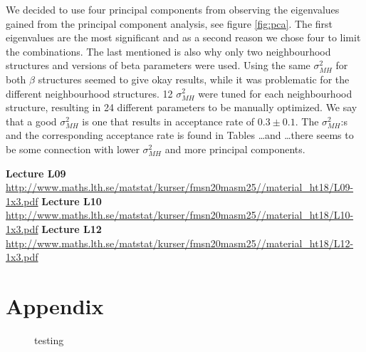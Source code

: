 \documentclass[a4paper,english]{article}
\newcommand{\sexion}[1]{\section{#1}}
\begin{document}
We decided to use four principal components from observing the eigenvalues gained from the principal component analysis, see figure \ref{fig:pca}. The first eigenvalues are the most significant and as a second reason we chose four to limit the combinations. The last mentioned is also why only two neighbourhood structures and versions of beta parameters were used.
Using the same $\sigma_{MH}^2$ for both $\beta$ structures seemed to give okay results, while it was problematic for the different neighbourhood structures. 12 $\sigma_{MH}^2$ were tuned for each neighbourhood structure, resulting in 24 different parameters to be manually optimized.
We say that a good $\sigma_{MH}^2$ is one that results in acceptance rate of $0.3 \pm 0.1$.
The $\sigma_{MH}^2$:s and the corresponding acceptance rate is found in Tables \dots and \dots there seems to be some connection with lower $\sigma_{MH}^2$ and more principal components.




\newpage

\begin{thebibliography}{37}
  \textbf{Lecture L09} \\
\url{http://www.maths.lth.se/matstat/kurser/fmsn20masm25//material_ht18/L09-1x3.pdf}
  \textbf{Lecture L10} \\
\url{http://www.maths.lth.se/matstat/kurser/fmsn20masm25//material_ht18/L10-1x3.pdf}
  \textbf{Lecture L12} \\
\url{http://www.maths.lth.se/matstat/kurser/fmsn20masm25//material_ht18/L12-1x3.pdf}
\end{thebibliography}
\pagebreak{}

\sexion{Appendix}
\begin{figure}[H]
  \centering
  \caption{testing}
  \label{fig:test}
\end{figure}


% 


\pagebreak{}
\thispagestyle{empty}
\end{document}

